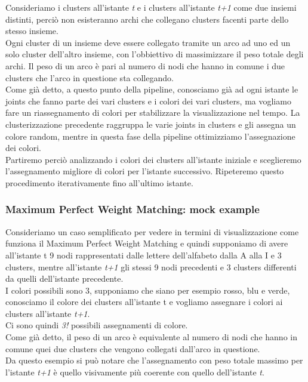 Consideriamo i clusters all'istante \textit{t} e i clusters all'istante \textit{t+1} come due insiemi distinti, perciò non esisteranno archi che collegano clusters facenti parte dello stesso insieme. \\
Ogni cluster di un insieme deve essere collegato tramite un arco ad uno ed un solo cluster dell'altro insieme, con l'obbiettivo di massimizzare il peso totale degli archi.
Il peso di un arco è pari al numero di nodi che hanno in comune i due clusters che l'arco in questione sta collegando. \\
Come già detto, a questo punto della pipeline, conosciamo già ad ogni istante le joints che fanno parte dei vari clusters e i colori dei vari clusters, ma vogliamo fare un riassegnamento di colori per stabilizzare la visualizzazione nel tempo.
La clusterizzazione precedente raggruppa le varie joints in clusters e gli assegna un colore random, mentre in questa fase della pipeline ottimizziamo l'assegnazione dei colori. \\
Partiremo perciò analizzando i colori dei clusters all'istante iniziale e sceglieremo l'assegnamento migliore di colori per l'istante successivo.
Ripeteremo questo procedimento iterativamente fino all'ultimo istante.


\subsubsection{Maximum Perfect Weight Matching: mock example}
Consideriamo un caso semplificato per vedere in termini di visualizzazione come funziona il Maximum Perfect Weight Matching e quindi supponiamo di avere all'istante t 9 nodi rappresentati dalle lettere dell'alfabeto dalla A alla I e 3 clusters, mentre all'istante \textit{t+1} gli stessi 9 nodi precedenti e 3 clusters differenti da quelli dell'istante precedente. \\
I colori possibili sono 3, supponiamo che siano per esempio rosso, blu e verde, conosciamo il colore dei clusters all'istante t e vogliamo assegnare i colori ai clusters all'istante \textit{t+1}.\\
Ci sono quindi \textit{3!} possibili assegnamenti di colore. \\
Come già detto, il peso di un arco è equivalente al numero di nodi che hanno in comune quei due clusters che vengono collegati dall'arco in questione. \\
Da questo esempio si può notare che l'assegnamento con peso totale massimo per l'istante \textit{t+1} è quello visivamente più coerente con quello dell'istante \textit{t}.


